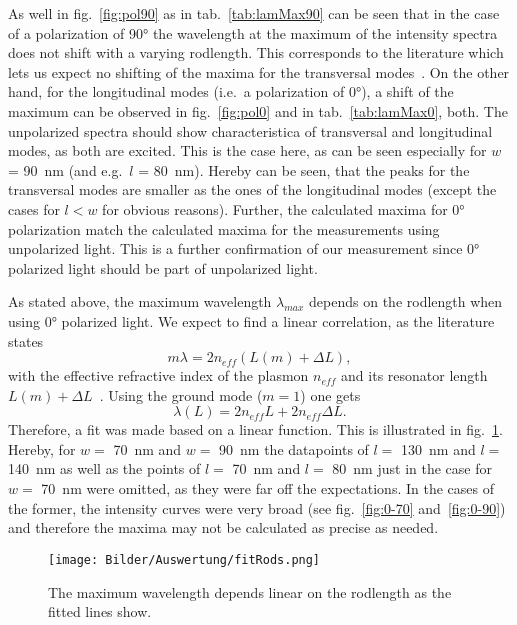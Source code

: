     
As well in fig.~\ref{fig:pol90} as in tab.~\ref{tab:lamMax90} can be seen that in the case of a polarization of \ang{90} the wavelength at the maximum of the intensity spectra does not shift with a varying rodlength. This corresponds to the literature which lets us expect no shifting of the maxima for the transversal modes~\cite{LehrstuhlExperimentalphysikIII.2023}. On the other hand, for the longitudinal modes (i.e.~a polarization of \ang{0}), a shift of the maximum can be observed in fig.~\ref{fig:pol0} and in tab.~\ref{tab:lamMax0}, both. The unpolarized spectra should show characteristica of transversal and longitudinal modes, as both are excited. This is the case here, as can be seen especially for $w$ = \SI{90}{\nano\meter} (and e.g.~$l$ = \SI{80}{\nano\meter}). Hereby can be seen, that the peaks for the transversal modes are smaller as the ones of the longitudinal modes (except the cases for $l<w$ for obvious reasons). Further, the calculated maxima for \ang{0} polarization match the calculated maxima for the measurements using unpolarized light. This is a further confirmation of our measurement since \ang{0} polarized light should be part of unpolarized light. \par 
As stated above, the maximum wavelength $\lambda_{max}$ depends on the rodlength when using \ang{0} polarized light. We expect to find a linear correlation, as the literature states 
\begin{equation}
    m \lambda = 2n_{eff}(L(m)+\Delta L),
\end{equation}
with the effective refractive index of the plasmon $n_{eff}$ and its resonator length $L(m)+\Delta L$~\cite{LehrstuhlExperimentalphysikIII.2023}. Using the ground mode ($m=1$) one gets 
\begin{equation}
    \lambda (L) = 2n_{eff}L + 2n_{eff}\Delta L.
\end{equation}
Therefore, a fit was made based on a linear function. This is illustrated in fig.~\ref{fig:rodlength}. Hereby, for $w =$ \SI{70}{\nano\meter} and $w =$ \SI{90}{\nano\meter} the datapoints of $l =$ \SI{130}{\nano\meter} and $l =$ \SI{140}{\nano\meter} as well as the points of $l =$ \SI{70}{\nano\meter} and $l =$ \SI{80}{\nano\meter} just in the case for $w =$ \SI{70}{\nano\meter} were omitted, as they were far off the expectations. In the cases of the former, the intensity curves were very broad (see fig.~\ref{fig:0-70} and~\ref{fig:0-90}) and therefore the maxima may not be calculated as precise as needed.

\begin{figure}
    \centering
    \texttt{[image: Bilder/Auswertung/fitRods.png]}
    \caption{The maximum wavelength depends linear on the rodlength as the fitted lines show.}
    \label{fig:rodlength}
\end{figure}


